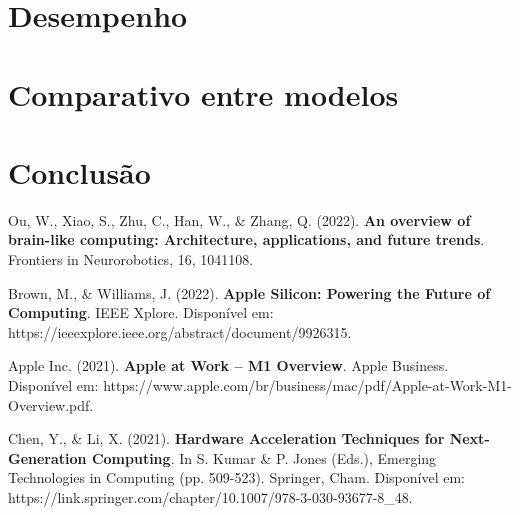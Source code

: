 \documentclass[a4paper,times,12pt]{article}
\begin{document}
\hspace{+15pt}

\section{Desempenho}
\hspace{+15pt}


\section{Comparativo entre modelos}
\hspace{+15pt}


\section{Conclusão}
\hspace{+15pt}



\newpage
\begin{thebibliography}{00}
 Ou, W., Xiao, S., Zhu, C., Han, W., \& Zhang, Q. (2022). \textbf{An overview of brain-like computing: Architecture, applications, and future trends}. Frontiers in Neurorobotics, 16, 1041108.

 Brown, M., \& Williams, J. (2022). \textbf{Apple Silicon: Powering the Future of Computing}. IEEE Xplore. Disponível em: https://ieeexplore.ieee.org/abstract/document/9926315.

 Apple Inc. (2021). \textbf{Apple at Work – M1 Overview}. Apple Business. Disponível em: https://www.apple.com/br/business/mac/pdf/Apple-at-Work-M1-Overview.pdf.

 Chen, Y., \& Li, X. (2021). \textbf{Hardware Acceleration Techniques for Next-Generation Computing}. In S. Kumar \& P. Jones (Eds.), Emerging Technologies in Computing (pp. 509-523). Springer, Cham. Disponível em: https://link.springer.com/chapter/10.1007/978-3-030-93677-8\_48.
\end{thebibliography}
\end{document}
